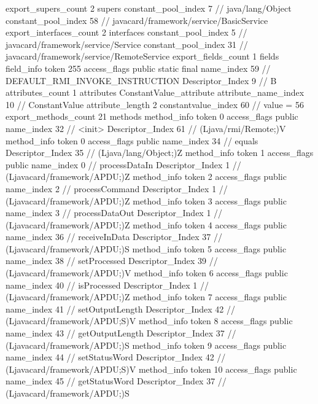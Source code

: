 {{{			export_supers_count	2
			supers {
				constant_pool_index	7		// java/lang/Object
				constant_pool_index	58		// javacard/framework/service/BasicService
			}
			export_interfaces_count	2
			interfaces {
				constant_pool_index	5		// javacard/framework/service/Service
				constant_pool_index	31		// javacard/framework/service/RemoteService
			}
			export_fields_count	1
			fields {
			field_info {
				token	255
				access_flags	public static final
				name_index	59		// DEFAULT_RMI_INVOKE_INSTRUCTION
				Descriptor_Index	9		// B
				attributes_count	1
				attributes {
				ConstantValue_attribute {
					attribute_name_index	10		// ConstantValue
					attribute_length	2
					constantvalue_index	60		// value = 56
				}
				}
			}
			}
			export_methods_count	21
			methods {
				method_info {
					token	0
					access_flags	public
					name_index	32		// <init>
					Descriptor_Index	61		// (Ljava/rmi/Remote;)V
				}
				method_info {
					token	0
					access_flags	public
					name_index	34		// equals
					Descriptor_Index	35		// (Ljava/lang/Object;)Z
				}
				method_info {
					token	1
					access_flags	public
					name_index	0		// processDataIn
					Descriptor_Index	1		// (Ljavacard/framework/APDU;)Z
				}
				method_info {
					token	2
					access_flags	public
					name_index	2		// processCommand
					Descriptor_Index	1		// (Ljavacard/framework/APDU;)Z
				}
				method_info {
					token	3
					access_flags	public
					name_index	3		// processDataOut
					Descriptor_Index	1		// (Ljavacard/framework/APDU;)Z
				}
				method_info {
					token	4
					access_flags	public
					name_index	36		// receiveInData
					Descriptor_Index	37		// (Ljavacard/framework/APDU;)S
				}
				method_info {
					token	5
					access_flags	public
					name_index	38		// setProcessed
					Descriptor_Index	39		// (Ljavacard/framework/APDU;)V
				}
				method_info {
					token	6
					access_flags	public
					name_index	40		// isProcessed
					Descriptor_Index	1		// (Ljavacard/framework/APDU;)Z
				}
				method_info {
					token	7
					access_flags	public
					name_index	41		// setOutputLength
					Descriptor_Index	42		// (Ljavacard/framework/APDU;S)V
				}
				method_info {
					token	8
					access_flags	public
					name_index	43		// getOutputLength
					Descriptor_Index	37		// (Ljavacard/framework/APDU;)S
				}
				method_info {
					token	9
					access_flags	public
					name_index	44		// setStatusWord
					Descriptor_Index	42		// (Ljavacard/framework/APDU;S)V
				}
				method_info {
					token	10
					access_flags	public
					name_index	45		// getStatusWord
					Descriptor_Index	37		// (Ljavacard/framework/APDU;)S
}}}}}
